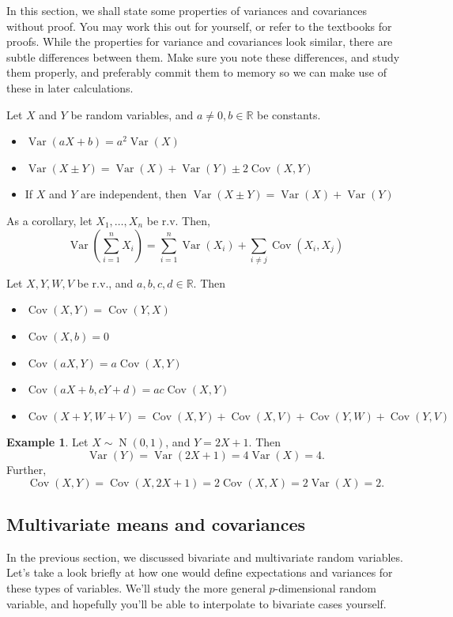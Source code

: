 \documentclass[
]{book}
\providecommand{\tightlist}{%
  \setlength{\itemsep}{0pt}\setlength{\parskip}{0pt}}
\DeclareMathOperator{\Var}{Var}
\DeclareMathOperator{\Cov}{Cov}
\DeclareMathOperator{\N}{N}
\newcommand{\bbR}{\mathbb{R}}
\theoremstyle{definition}
\theoremstyle{definition}
\newtheorem{example}{Example}[chapter]
\theoremstyle{definition}
\theoremstyle{definition}
\theoremstyle{remark}
\begin{document}
In this section, we shall state some properties of variances and covariances without proof.
You may work this out for yourself, or refer to the textbooks for proofs.
While the properties for variance and covariances look similar, there are subtle differences between them.
Make sure you note these differences, and study them properly, and preferably commit them to memory so we can make use of these in later calculations.

Let \(X\) and \(Y\) be random variables, and \(a\neq0,b\in\bbR\) be constants.

\begin{itemize}
\tightlist
\item
  \(\Var(aX + b) = a^2\Var(X)\)
\item
  \(\Var(X \pm Y) = \Var(X) + \Var(Y) \pm 2\Cov(X,Y)\)
\item
  If \(X\) and \(Y\) are independent, then \(\Var(X \pm Y) = \Var(X) + \Var(Y)\)
\end{itemize}

As a corollary, let \(X_1,\dots,X_n\) be r.v. Then,
\[
\Var \left(\sum_{i=1}^nX_i \right) = \sum_{i=1}^n \Var(X_i) + \sum_{i\neq j}\Cov(X_i,X_j)
\]

Let \(X,Y,W,V\) be r.v., and \(a,b,c,d\in\bbR\). Then

\begin{itemize}
\tightlist
\item
  \(\Cov(X,Y) = \Cov(Y,X)\)
\item
  \(\Cov(X,b) = 0\)
\item
  \(\Cov(aX,Y) = a\Cov(X,Y)\)
\item
  \(\Cov(aX+b,cY+d)=ac\Cov(X,Y)\)
\item
  \(\Cov(X+Y,W+V)=\Cov(X,Y) + \Cov(X, V) + \Cov(Y,W) + \Cov(Y,V)\)
\end{itemize}

\begin{example}
Let \(X\sim\N(0,1)\), and \(Y=2X+1\). Then \[\Var(Y)=\Var(2X+1)=4\Var(X) = 4.\] Further, \[\Cov(X,Y)=\Cov(X,2X+1)=2\Cov(X,X)=2\Var(X)=2.\]
\end{example}

\hypertarget{multivariate-means-and-covariances}{%
\subsection{Multivariate means and covariances}\label{multivariate-means-and-covariances}}

In the previous section, we discussed bivariate and multivariate random variables.
Let's take a look briefly at how one would define expectations and variances for these types of variables.
We'll study the more general \(p\)-dimensional random variable, and hopefully you'll be able to interpolate to bivariate cases yourself.
\end{document}
